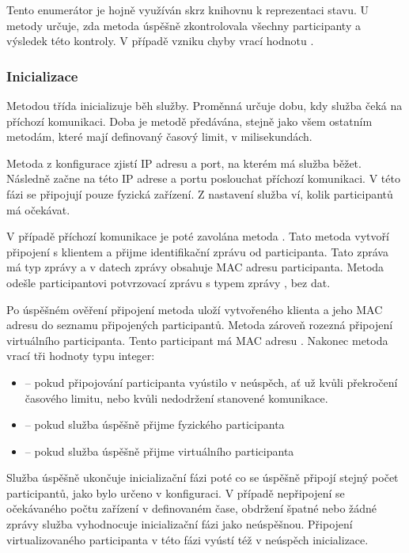 Tento enumerátor je hojně využíván skrz knihovnu k reprezentaci stavu. U metody  určuje, zda metoda úspěšně zkontrolovala všechny participanty a výsledek této kontroly. V případě vzniku chyby vrací hodnotu .

\subsubsection{Inicializace}

Metodou  třída  inicializuje běh služby. Proměnná  určuje dobu, kdy služba čeká na příchozí komunikaci. Doba je metodě předávána, stejně jako všem ostatním metodám, které mají definovaný časový limit, v milisekundách. 

Metoda z konfigurace zjistí IP adresu a port, na kterém má služba běžet. Následně začne na této IP adrese a portu poslouchat příchozí komunikaci. V této fázi se připojují pouze fyzická zařízení. Z nastavení služba ví, kolik participantů má očekávat. 

V případě příchozí komunikace je poté zavolána metoda . Tato metoda vytvoří připojení s klientem a přijme identifikační zprávu od participanta. Tato zpráva má typ zprávy  a v datech zprávy obsahuje MAC adresu participanta. Metoda odešle participantovi potvrzovací zprávu s typem zprávy , bez dat. 

Po úspěšném ověření připojení metoda uloží vytvořeného klienta a jeho MAC adresu do seznamu připojených participantů. Metoda zároveň rozezná připojení virtuálního participanta. Tento participant má MAC adresu . Nakonec metoda vrací tři hodnoty typu integer:
\begin{itemize}
    \item {} -- pokud připojování participanta vyústilo v neúspěch, ať už kvůli překročení časového limitu, nebo kvůli nedodržení stanovené komunikace.
    \item {} -- pokud služba úspěšně přijme fyzického participanta
    \item {} -- pokud služba úspěšně přijme virtuálního participanta
\end{itemize}

Služba úspěšně ukončuje inicializační fázi poté co se úspěšně připojí stejný počet participantů, jako bylo určeno v konfiguraci. V případě nepřipojení se očekávaného počtu zařízení v definovaném čase, obdržení špatné nebo žádné zprávy služba vyhodnocuje inicializační fázi jako neúspěšnou. Připojení virtualizovaného participanta v této fázi vyústí též v neúspěch inicializace.

